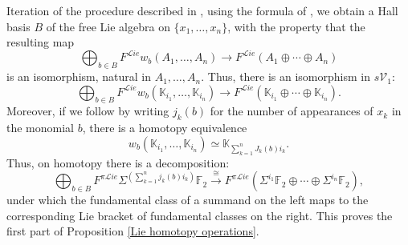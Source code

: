 \documentclass[11pt]{amsart} \renewcommand{\baselinestretch}{1.2}
\theoremstyle{plain}
\numberwithin{equation}{section} %
\theoremstyle{plain}
\numberwithin{equation}{chapter} %
\renewcommand{\to}{\longrightarrow}
\newcommand{\scrL}{\mathscr{L}}
\newcommand{\calV}{\mathcal{V}}
\newcommand{\citeBOX}[2][]{\cite[\mbox{#1}]{#2}}
\newcommand{\vect}[2]{\calV^{#1}_{#2}}
\newcommand{\PA}[1]{\pi#1}
\newcommand{\F}{\mathbb{F}}
\newcommand{\liealgs}{{\scrL\!\textit{ie}}}
\newcommand{\Ftwo}{\F_2}
\begin{document}
\begin{Constructing homotopy operations}
Iteration of the procedure described in \citeBOX[\S4.3]{Neisendorfer.pdf}, using the formula of \cite[Proposition 3.1]{Schles-SimpLieRing.pdf}, we obtain a Hall basis $B$ of the free Lie algebra on $\{x_1,\ldots,x_n\}$, with the property that the resulting map
\[\bigoplus_{b\in B}F^{\liealgs}w_b(A_1,\ldots,A_n)\to F^\liealgs(A_1\oplus\cdots\oplus A_n)\]
is an isomorphism, natural  in $A_1,\ldots,A_n$.
Thus, there is an isomorphism in $s\vect{}{1}$:
\[\bigoplus_{b\in B}F^{\liealgs}w_b(\mathbb{K}_{i_1},\ldots,\mathbb{K}_{i_n})\to F^\liealgs(\mathbb{K}_{i_1}\oplus\cdots \oplus \mathbb{K}_{i_n}).\]
Moreover, if we follow \citeBOX[\S11]{MR1089001} by writing $j_k(b)$ for the number of appearances of $x_k$ in the monomial $b$, there is a homotopy equivalence
\[w_b(\mathbb{K}_{i_1},\ldots,\mathbb{K}_{i_n})\simeq \mathbb{K}_{\sum_{k=1}^n J_k(b)i_k}.\]
Thus, on homotopy there is a decomposition:
\[\bigoplus_{b\in B}F^{\PA{\liealgs}}\Sigma^{(\sum_{k=1}^n j_k(b)i_k)}\Ftwo\overset{\cong}{\to} F^{\PA{\liealgs}}(\Sigma^{i_1}\Ftwo\oplus\cdots \oplus\Sigma^{i_n}\Ftwo),\]
under which the fundamental class of a summand on the left maps to the corresponding Lie bracket of fundamental classes on the right. This proves the first part of Proposition \ref{Lie homotopy operations}.


\end{Constructing homotopy operations}
\end{document}
